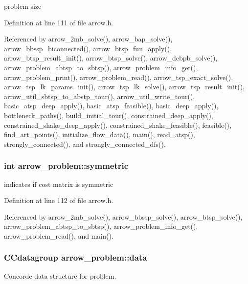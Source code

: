 problem size 

Definition at line 111 of file arrow.h.

Referenced by arrow\_\-2mb\_\-solve(), arrow\_\-bap\_\-solve(), arrow\_\-bbssp\_\-biconnected(), arrow\_\-btsp\_\-fun\_\-apply(), arrow\_\-btsp\_\-result\_\-init(), arrow\_\-btsp\_\-solve(), arrow\_\-dcbpb\_\-solve(), arrow\_\-problem\_\-abtsp\_\-to\_\-sbtsp(), arrow\_\-problem\_\-info\_\-get(), arrow\_\-problem\_\-print(), arrow\_\-problem\_\-read(), arrow\_\-tsp\_\-exact\_\-solve(), arrow\_\-tsp\_\-lk\_\-params\_\-init(), arrow\_\-tsp\_\-lk\_\-solve(), arrow\_\-tsp\_\-result\_\-init(), arrow\_\-util\_\-sbtsp\_\-to\_\-abstp\_\-tour(), arrow\_\-util\_\-write\_\-tour(), basic\_\-atsp\_\-deep\_\-apply(), basic\_\-atsp\_\-feasible(), basic\_\-deep\_\-apply(), bottleneck\_\-paths(), build\_\-initial\_\-tour(), constrained\_\-deep\_\-apply(), constrained\_\-shake\_\-deep\_\-apply(), constrained\_\-shake\_\-feasible(), feasible(), find\_\-art\_\-points(), initialize\_\-flow\_\-data(), main(), read\_\-atsp(), strongly\_\-connected(), and strongly\_\-connected\_\-dfs().\hypertarget{structarrow__problem_168ab92e9d7a873740a2550f4d3510d9}{
\subsubsection{\setlength{\rightskip}{0pt plus 5cm}int {\bf arrow\_\-problem::symmetric}}}
\label{structarrow__problem_168ab92e9d7a873740a2550f4d3510d9}


indicates if cost matrix is symmetric 

Definition at line 112 of file arrow.h.

Referenced by arrow\_\-2mb\_\-solve(), arrow\_\-bbssp\_\-solve(), arrow\_\-btsp\_\-solve(), arrow\_\-problem\_\-abtsp\_\-to\_\-sbtsp(), arrow\_\-problem\_\-info\_\-get(), arrow\_\-problem\_\-read(), and main().\hypertarget{structarrow__problem_5f04fe51bf6438b8f844c8cc06eb5ba0}{
\subsubsection{\setlength{\rightskip}{0pt plus 5cm}CCdatagroup {\bf arrow\_\-problem::data}}}
\label{structarrow__problem_5f04fe51bf6438b8f844c8cc06eb5ba0}


Concorde data structure for problem. 

